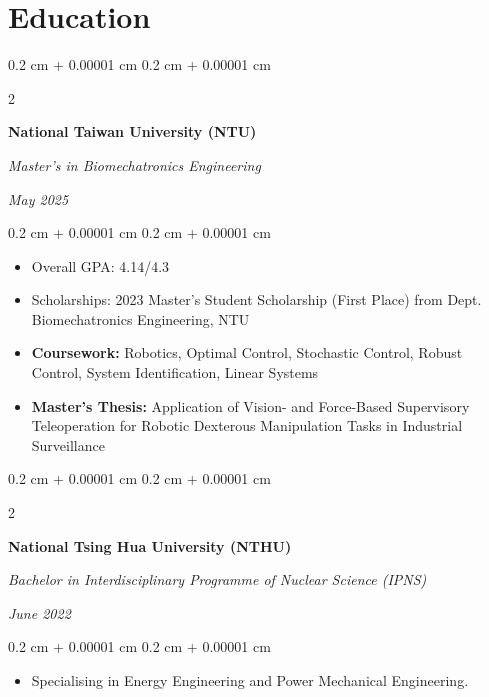 \documentclass[10pt, letterpaper]{article}
\newenvironment{highlights}{
    \begin{itemize}[
        topsep=0.10 cm,
        parsep=0.10 cm,
        partopsep=0pt,
        itemsep=0pt,
        leftmargin=0.4 cm + 10pt
    ]
}{
    \end{itemize}
} %
\newenvironment{onecolentry}{
    \begin{adjustwidth}{
        0.2 cm + 0.00001 cm
    }{
        0.2 cm + 0.00001 cm
    }
}{
    \end{adjustwidth}
} %
\newenvironment{twocolentry}[2][]{
    \onecolentry
    \def\secondColumn{#2}
    \setcolumnwidth{\fill, 4.5 cm}
    \begin{paracol}{2}
}{
    \switchcolumn \raggedleft \secondColumn
    \end{paracol}
    \endonecolentry
} %
\begin{document}
    \vspace{0.3 cm - 0.3 cm}

    \section{Education}
        
        \begin{twocolentry}{
            
            
        \textit{May 2025}}
            \textbf{National Taiwan University (NTU)}

            \textit{Master's in Biomechatronics Engineering}
        \end{twocolentry}

        \vspace{0.10 cm}
        \begin{onecolentry}
            \begin{highlights}
                \item Overall GPA: 4.14/4.3
                \item Scholarships: 2023 Master's Student Scholarship (First Place) from Dept. Biomechatronics Engineering, NTU
                \item \textbf{Coursework:} Robotics, Optimal Control, Stochastic Control, Robust Control, System Identification, Linear Systems
                \item \textbf{Master's Thesis:} Application of Vision- and Force-Based Supervisory Teleoperation for Robotic Dexterous Manipulation Tasks in Industrial Surveillance
            \end{highlights}
        \end{onecolentry}

        \vspace{0.2 cm}

        \begin{twocolentry}{
            
        \textit{June 2022}}
            \textbf{National Tsing Hua University (NTHU)}
            
            \textit{Bachelor in Interdisciplinary Programme of Nuclear Science (IPNS)}
        \end{twocolentry}
        \vspace{0.10 cm}
        \begin{onecolentry}
            \begin{highlights}
                \item Specialising in Energy Engineering and Power Mechanical Engineering.
            \end{highlights}
        \end{onecolentry}
\end{document}
